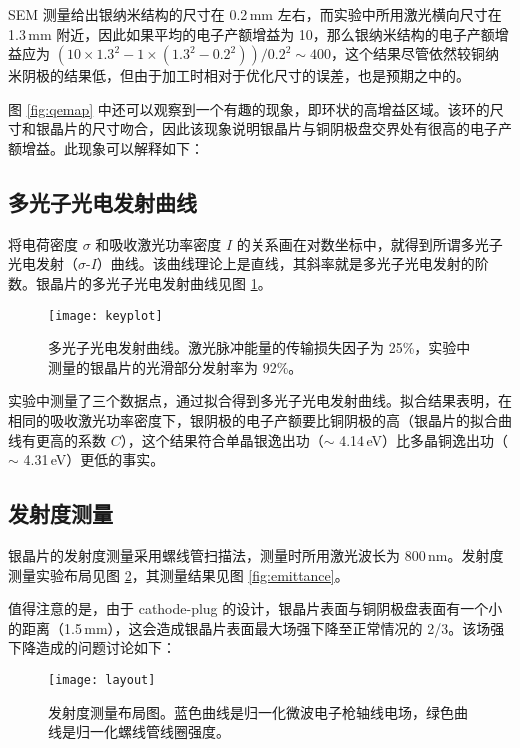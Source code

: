 SEM 测量给出银纳米结构的尺寸在 0.2\,mm 左右，而实验中所用激光横向尺寸在 1.3\,mm 附近，因此如果平均的电子产额增益为 10，那么银纳米结构的电子产额增益应为 $(10\times1.3^2-1\times(1.3^2-0.2^2))/0.2^2 \sim 400$，这个结果尽管依然较铜纳米阴极的结果低，但由于加工时相对于优化尺寸的误差，也是预期之中的。

图 \ref{fig:qemap} 中还可以观察到一个有趣的现象，即环状的高增益区域。该环的尺寸和银晶片的尺寸吻合，因此该现象说明银晶片与铜阴极盘交界处有很高的电子产额增益。此现象可以解释如下：

\subsection{多光子光电发射曲线}
将电荷密度 $\sigma$ 和吸收激光功率密度 $I$ 的关系画在对数坐标中，就得到所谓多光子光电发射（$\sigma$-$I$）曲线\cite{Girardeau-Montaut:1993aa,Kupersztych:1994aa}。该曲线理论上是直线，其斜率就是多光子光电发射的阶数。银晶片的多光子光电发射曲线见图 \ref{fig:key}。
\begin{figure}[htbp]
\begin{center}
\texttt{[image: keyplot]}
\caption{\label{fig:key} 
多光子光电发射曲线。激光脉冲能量的传输损失因子为 25\%，实验中测量的银晶片的光滑部分发射率为 92\%。}
\end{center}
\end{figure}

实验中测量了三个数据点，通过拟合得到多光子光电发射曲线。拟合结果表明，在相同的吸收激光功率密度下，银阴极的电子产额要比铜阴极的高\cite{Li:2013aa}（银晶片的拟合曲线有更高的系数 $C$），这个结果符合单晶银逸出功（$\sim$ 4.14\,eV）比多晶铜逸出功（$\sim$ 4.31\,eV）更低的事实。

\subsection{发射度测量\label{ssec:emit}}
银晶片的发射度测量采用螺线管扫描法\cite{Ross:1987aa}，测量时所用激光波长为 800\,nm。发射度测量实验布局见图 \ref{fig:layout}，其测量结果见图 \ref{fig:emittance}。

值得注意的是，由于 cathode-plug 的设计，银晶片表面与铜阴极盘表面有一个小的距离（1.5\,mm），这会造成银晶片表面最大场强下降至正常情况的 2/3。该场强下降造成的问题讨论如下：

\begin{figure}[htbp]
\begin{center}
\texttt{[image: layout]}
\caption{\label{fig:layout} 
发射度测量布局图。蓝色曲线是归一化微波电子枪轴线电场，绿色曲线是归一化螺线管线圈强度。}
\end{center}
\end{figure}

